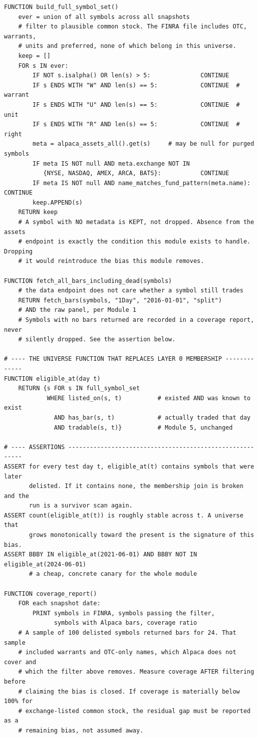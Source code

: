 \documentclass[10pt]{article}
\begin{document}
\begin{lstlisting}
FUNCTION build_full_symbol_set()
    ever = union of all symbols across all snapshots
    # filter to plausible common stock. The FINRA file includes OTC, warrants,
    # units and preferred, none of which belong in this universe.
    keep = []
    FOR s IN ever:
        IF NOT s.isalpha() OR len(s) > 5:              CONTINUE
        IF s ENDS WITH "W" AND len(s) == 5:            CONTINUE  # warrant
        IF s ENDS WITH "U" AND len(s) == 5:            CONTINUE  # unit
        IF s ENDS WITH "R" AND len(s) == 5:            CONTINUE  # right
        meta = alpaca_assets_all().get(s)     # may be null for purged symbols
        IF meta IS NOT null AND meta.exchange NOT IN
           {NYSE, NASDAQ, AMEX, ARCA, BATS}:           CONTINUE
        IF meta IS NOT null AND name_matches_fund_pattern(meta.name): CONTINUE
        keep.APPEND(s)
    RETURN keep
    # A symbol with NO metadata is KEPT, not dropped. Absence from the assets
    # endpoint is exactly the condition this module exists to handle. Dropping
    # it would reintroduce the bias this module removes.

FUNCTION fetch_all_bars_including_dead(symbols)
    # the data endpoint does not care whether a symbol still trades
    RETURN fetch_bars(symbols, "1Day", "2016-01-01", "split")
    # AND the raw panel, per Module 1
    # Symbols with no bars returned are recorded in a coverage report, never
    # silently dropped. See the assertion below.

# ---- THE UNIVERSE FUNCTION THAT REPLACES LAYER 0 MEMBERSHIP -------------
FUNCTION eligible_at(day t)
    RETURN {s FOR s IN full_symbol_set
            WHERE listed_on(s, t)          # existed AND was known to exist
              AND has_bar(s, t)            # actually traded that day
              AND tradable(s, t)}          # Module 5, unchanged

# ---- ASSERTIONS ---------------------------------------------------------
ASSERT for every test day t, eligible_at(t) contains symbols that were later
       delisted. If it contains none, the membership join is broken and the
       run is a survivor scan again.
ASSERT count(eligible_at(t)) is roughly stable across t. A universe that
       grows monotonically toward the present is the signature of this bias.
ASSERT BBBY IN eligible_at(2021-06-01) AND BBBY NOT IN eligible_at(2024-06-01)
       # a cheap, concrete canary for the whole module

FUNCTION coverage_report()
    FOR each snapshot date:
        PRINT symbols in FINRA, symbols passing the filter,
              symbols with Alpaca bars, coverage ratio
    # A sample of 100 delisted symbols returned bars for 24. That sample
    # included warrants and OTC-only names, which Alpaca does not cover and
    # which the filter above removes. Measure coverage AFTER filtering before
    # claiming the bias is closed. If coverage is materially below 100% for
    # exchange-listed common stock, the residual gap must be reported as a
    # remaining bias, not assumed away.


\end{lstlisting}
\end{document}
